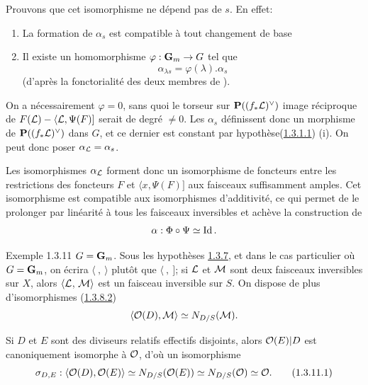 \documentclass[10pt]{../fichiers-configuration-latex/smfart}
\begin{document}
Prouvons que cet isomorphisme ne dépend pas de $s$. En effet:
\begin{enumerate}
\renewcommand{\theenumi}{\roman{enumi}}
\renewcommand{\labelenumi}{(\theenumi)}
\item La formation de $\alpha_{s}$ est compatible à tout changement de
base

\item Il existe un homomorphisme $\varphi:\mathbf{G}_{m}\rightarrow G$ tel que
$$
\alpha_{\lambda s}=\varphi(\lambda).\alpha_{s}
$$
(d'après la fonctorialité des deux membres de ).
\end{enumerate}

On a nécessairement $\varphi=0$, sans quoi le torseur sur
$\mathbf{P}((f_{\ast}{\mathcal L})^{\vee})$ image réciproque de
$F({\mathcal L})-\langle {\mathcal L},\Psi(F)]$ serait de degré $\neq 0$. Les
$\alpha_{s}$ définissent donc un morphisme de
$\mathbf{P}((f_{\ast}{\mathcal L})^{\vee})$ dans $G$, et ce dernier est
constant par hypothèse\pageoriginale (\hyperref[XVIII.par1.3.1.1]{1.3.1.1}) (i). 
On peut donc poser $\alpha_{{\mathcal L}}=\alpha_{s}$.

Les isomorphismes $\alpha_{{\mathcal L}}$ forment donc un isomorphisme
de foncteurs entre les restrictions des foncteurs $F$ et $\langle x,\Psi(F)]$
aux faisceaux suffisamment amples. Cet isomorphisme est compatible aux
isomorphismes d'additivité, ce qui permet de le prolonger par
linéarité à tous les faisceaux inversibles et achève la construction
de
$$
\alpha:\Phi\circ\Psi\simeq \operatorname{Id}{}.
$$

\begin{enonce*}[remark]{Exemple 1.3.11}
$G=\mathbf{G}_{m}$. Sous les hypothèses \hyperref[XVIII.subsubsec1.3.7]{1.3.7}, et dans le cas
particulier où $G=\mathbf{G}_{m}$, on écrira $\langle~,~\rangle $ plutôt que
$\langle~,~]$; si ${\mathcal L}$ et ${\mathcal M}$ sont deux faisceaux inversibles
sur $X$, alors $\langle {\mathcal L}$, ${\mathcal M}\rangle $ est un faisceau
inversible sur $S$. On dispose de plus d'isomorphismes (\hyperref[XVIII.par1.3.8.2]{1.3.8.2})
$$
\langle {\mathcal O}(D),{\mathcal M}\rangle \simeq N_{D/S}({\mathcal M}){}.
$$

Si $D$ et $E$ sont des diviseurs relatifs  effectifs disjoints, alors
${\mathcal O}(E)|D$ est canoniquement isomorphe à ${\mathcal O}$, d'où un isomorphisme
\begin{equation}
\sigma_{D,E}:\langle {\mathcal O}(D),{\mathcal O}(E)\rangle \simeq N_{D/S}({\mathcal O}(E))\simeq
N_{D/S}({\mathcal O})\simeq {\mathcal O}{}.\tag{1.3.11.1}
\end{equation}
\end{enonce*}
\end{document}
